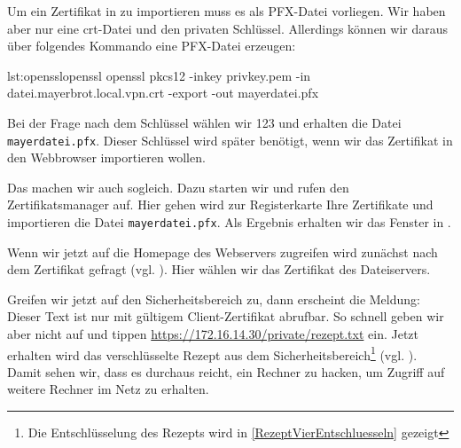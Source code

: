 
Um ein Zertifikat in \Firefox{} zu importieren muss es als PFX-Datei
vorliegen. Wir haben aber nur eine crt-Datei und den privaten
Schlüssel. Allerdings können wir daraus über folgendes Kommando eine PFX-Datei
erzeugen:

\begin{MetasploitCode}{lst:openssl}{openssl}
openssl pkcs12 -inkey privkey.pem -in datei.mayerbrot.local.vpn.crt -export -out mayerdatei.pfx
\end{MetasploitCode}

Bei der Frage nach dem Schlüssel wählen wir 123 und erhalten die Datei
\texttt{mayerdatei.pfx}. Dieser Schlüssel wird später benötigt, wenn wir das
Zertifikat in den Webbrowser importieren wollen.

Das machen wir auch sogleich. Dazu starten wir \Firefox{} und rufen den
Zertifikatsmanager auf. Hier gehen wird zur Registerkarte \glqq{}Ihre
Zertifikate\grqq{} und importieren die Datei \texttt{mayerdatei.pfx}. Als
Ergebnis erhalten wir das Fenster in .


Wenn wir jetzt auf die Homepage des Webservers zugreifen wird zunächst nach dem
Zertifikat gefragt (vgl. ). Hier wählen wir das
Zertifikat des Dateiservers.


Greifen wir jetzt auf den Sicherheitsbereich zu, dann erscheint die Meldung:
\glqq{}Dieser Text ist nur mit gültigem Client-Zertifikat abrufbar\grqq{}. So
schnell geben wir aber nicht auf und tippen
\url{https://172.16.14.30/private/rezept.txt} ein. Jetzt erhalten wird das
verschlüsselte Rezept aus dem Sicherheitsbereich\footnote{Die Entschlüsselung
  des Rezepts wird in \cref{RezeptVierEntschluesseln} gezeigt}
(vgl. ). Damit sehen wir, dass es durchaus reicht,
ein Rechner zu hacken, um Zugriff auf weitere Rechner im Netz zu erhalten.




